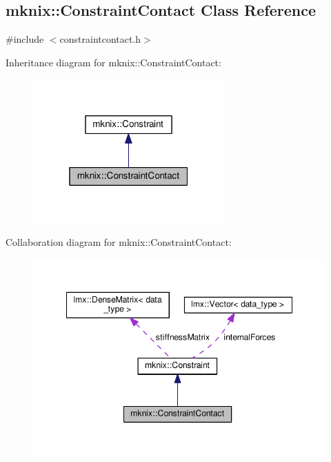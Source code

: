 \hypertarget{classmknix_1_1_constraint_contact}{}\subsection{mknix\+:\+:Constraint\+Contact Class Reference}
\label{classmknix_1_1_constraint_contact}


{\ttfamily \#include $<$constraintcontact.\+h$>$}



Inheritance diagram for mknix\+:\+:Constraint\+Contact\+:\nopagebreak
\begin{figure}[H]
\begin{center}
\leavevmode
\includegraphics[width=208pt]{d2/d65/classmknix_1_1_constraint_contact__inherit__graph}
\end{center}
\end{figure}


Collaboration diagram for mknix\+:\+:Constraint\+Contact\+:\nopagebreak
\begin{figure}[H]
\begin{center}
\leavevmode
\includegraphics[width=348pt]{d1/d4f/classmknix_1_1_constraint_contact__coll__graph}
\end{center}
\end{figure}
